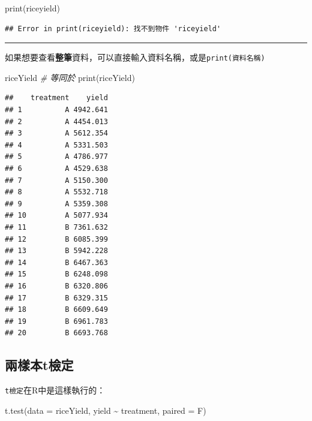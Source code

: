 \documentclass[
]{book}
\newenvironment{Shaded}{\begin{snugshade}}{\end{snugshade}}
\newcommand{\AttributeTok}[1]{\textcolor[rgb]{0.77,0.63,0.00}{#1}}
\newcommand{\CommentTok}[1]{\textcolor[rgb]{0.56,0.35,0.01}{\textit{#1}}}
\newcommand{\FunctionTok}[1]{\textcolor[rgb]{0.00,0.00,0.00}{#1}}
\newcommand{\NormalTok}[1]{#1}
\newcommand{\SpecialCharTok}[1]{\textcolor[rgb]{0.00,0.00,0.00}{#1}}
\begin{document}
\begin{Shaded}
\begin{Highlighting}[]
\FunctionTok{print}\NormalTok{(riceyield)}
\end{Highlighting}
\end{Shaded}

\begin{verbatim}
## Error in print(riceyield): 找不到物件 'riceyield'
\end{verbatim}

\begin{center}\rule{0.5\linewidth}{0.5pt}\end{center}

如果想要查看\textbf{整筆}資料，可以直接輸入資料名稱，或是\texttt{print(資料名稱)}

\begin{Shaded}
\begin{Highlighting}[]
\NormalTok{riceYield}
\CommentTok{\# 等同於}
\FunctionTok{print}\NormalTok{(riceYield)}
\end{Highlighting}
\end{Shaded}

\begin{verbatim}
##    treatment    yield
## 1          A 4942.641
## 2          A 4454.013
## 3          A 5612.354
## 4          A 5331.503
## 5          A 4786.977
## 6          A 4529.638
## 7          A 5150.300
## 8          A 5532.718
## 9          A 5359.308
## 10         A 5077.934
## 11         B 7361.632
## 12         B 6085.399
## 13         B 5942.228
## 14         B 6467.363
## 15         B 6248.098
## 16         B 6320.806
## 17         B 6329.315
## 18         B 6609.649
## 19         B 6961.783
## 20         B 6693.768
\end{verbatim}

\hypertarget{ux5169ux6a23ux672ctux6aa2ux5b9a}{%
\subsection{兩樣本t檢定}\label{ux5169ux6a23ux672ctux6aa2ux5b9a}}

\texttt{t檢定}在R中是這樣執行的：

\begin{Shaded}
\begin{Highlighting}[]
\FunctionTok{t.test}\NormalTok{(}\AttributeTok{data =}\NormalTok{ riceYield, }
\NormalTok{       yield }\SpecialCharTok{\textasciitilde{}}\NormalTok{ treatment,    }
       \AttributeTok{paired =}\NormalTok{ F)       }
\end{Highlighting}
\end{Shaded}
\end{document}
